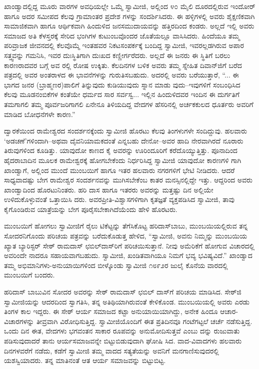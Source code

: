 ಖಾಂಡ್ವಾದಲ್ಲಿದ್ದ ಮೂರು ವಾರಗಳ ಅವಧಿಯಲ್ಲೇ ಒಮ್ಮೆ ಸ್ವಾಮೀಜಿ, ಅಲ್ಲಿಂದ ೪೦ ಮೈಲಿ ದೂರದಲ್ಲಿರುವ ಇಂದೋರ್ ಹಾಗೂ ಅದರ ಸಮೀಪದ ಕೆಲವು ಗ್ರಾಮಾಂತರ ಪ್ರದೇಶ ಗಳನ್ನು ಸಂದರ್ಶಿಸಿದರು. ಈ ಹಳ್ಳಿಗಳಲ್ಲಿ ಅವರು ಶೈಕ್ಷಣಿಕವಾಗಿ ಸಾಮಾಜಿಕವಾಗಿ ಹಾಗೂ ಆರ್ಥಿಕವಾಗಿ ಹಿಂದುಳಿದ ಜನಸಮುದಾಯವನ್ನು ಹತ್ತಿರದಿಂದ ಕಂಡರು. ಅಲ್ಲದೆ ಇಲ್ಲಿ ಅವರು ಸಮಾಜದ ಅತಿ ಕೆಳಸ್ತರಕ್ಕೆ ಸೇರಿದ ಭಂಗಿಗಳ ಕುಟುಂಬವೊಂದರ ಜೊತೆಯಲ್ಲೂ ವಾಸಿಸಿದರು. ಹಿಂದೆಯೂ ತಮ್ಮ ಪರಿವ್ರಾಜಕ ಜೀವನದಲ್ಲಿ ಕೆಲವೊಮ್ಮೆ ಇಂತಹವರ ನಿಕಟಸಂಪರ್ಕಕ್ಕೆ ಬಂದಿದ್ದ ಸ್ವಾಮೀಜಿ, ಇವರಲ್ಲಡಗಿರುವ ಅಪಾರ ಸತ್ತ್ವವನ್ನು ಗಮನಿಸಿ, ಇವರ ದುಃಸ್ಥಿತಿಗಾಗಿ ದುಃಖದ ಕಣ್ಣೀರ್ಗರೆದರು. ಅಲ್ಲದೆ ಈ ಜನರು ಈ ಸ್ಥಿತಿಗೆ ಬರಲು ಕಾರಣರಾದವರ ಬಗ್ಗೆ ಅವ ರಲ್ಲಿ ರೋಷ ಉಕ್ಕಿತು. ಕೆಲದಿನಗಳ ಬಳಿಕ ಅವರು ತಮ್ಮ ಸ್ನೇಹಿತ ದಿವಾನ್​ಜಿಗೆ ಬರೆದ ಪತ್ರದಲ್ಲಿ ಅವರ ಅಂತರಾಳದ ಈ ಭಾವನೆಗಳನ್ನು ಗುರುತಿಸಬಹುದು. ಅದರಲ್ಲಿ ಅವರು ಬರೆಯುತ್ತಾರೆ, “... ಈ ಭಾಗದ ಜನರ (ಬ್ರಾಹ್ಮಣರ)ಪಾಲಿಗೆ ತಿನ್ನುವುದು ಕುಡಿಯುವುದು ಸ್ನಾನ ಮಾಡು ವುದು–ಇವುಗಳಿಗೆ ಸಂಬಂಧಿಸಿದ ಕೆಲವು ಮೂಡನಂಬಿಕೆಗಳ ಕಂತೆಯೇ ಧರ್ಮದ ಸಾರ ಸರ್ವಸ್ವ... ಇಲ್ಲಿನ ಹಿಂದುಳಿದವರ ಇಂದಿನ ಈ ದುರ್ಗತಿಗೆ ತಮಗಾಗಲಿ ತಮ್ಮ ಪೂರ್ವಜರಿಗಾಗಲಿ ಏನೇನೂ ತಿಳಿಯದಿದ್ದ ವೇದಗಳ ಹೆಸರಿನಲ್ಲಿ ಅರ್ಚಕಕುಲದ ಧೂರ್ತರು ಅವರಿಗೆ ಮಾಡಿದ ಬೋಧನೆಗಳೇ ಕಾರಣ.”

ದ್ವಾರಕೆಯಿಂದ ರಾಮೇಶ್ವರದ ಸಂದರ್ಶನಕ್ಕೆಂದು ಸ್ವಾಮೀಜಿ ಹೊರಟು ಕೆಲವು ತಿಂಗಳುಗಳೇ ಸಂದಿದ್ದುವು. ಹಲವಾರು ‘ಅಡಚಣೆ’ಗಳಿಂದಾಗಿ–ಅಥವಾ ದೈವನಿಯಾಮಕದಂತೆ ಎನ್ನಬಹು ದೇನೋ–ಅವರ ಹಾದಿ ನೇರವಾಗಿರದೆ ನೂರಾರು ತಿರುವುಗಳಿಂದ ಕೂಡಿತ್ತು. ಯಾವುದೋ ಕಾಣದ ಕೈ ಅವರನ್ನು ಊರಿಂದೂರಿಗೆ ಕರೆದೊಯ್ಯುತ್ತಿತ್ತು. ಪೂನಾದಿಂದ ಹೈದರಾಬಾದಿನ ಮೂಲಕ ರಾಮೇಶ್ವರಕ್ಕೆ ಹೋಗಬೇಕೆಂದು ನಿರ್ಧರಿಸಿದ್ದ ಸ್ವಾಮೀಜಿ ಯಾವುದೋ ಕಾರಣಗಳಿ ಗಾಗಿ ಖಾಂಡ್ವಾಗೆ, ಅಲ್ಲಿಂದ ಮುಂದೆ ಮುಂಬಯಿಗೆ ಹಾಗೂ ಇತರ ಹಲವಾರು ನಗರಗಳಿಗೆ ಭೇಟಿ ನೀಡಿದರು. ಆದರೆ ಸಾಧ್ಯವಾದಷ್ಟು ಬೇಗ ರಾಮೇಶ್ವರ ಸಂದರ್ಶನವನ್ನು ಮುಗಿಸಬೇಕೆಂಬ ಕಾತರ ಮನಸ್ಸಿನಲ್ಲಿದ್ದೇ ಇತ್ತು. ಆದ್ದರಿಂದ ಅವರು ಖಾಂಡ್ವಾದಿಂದ ಹೊರಟುನಿಂತರು. ಹರಿ ದಾಸ ಹಾಗೂ ಇತರರು ಅವರನ್ನು ಮತ್ತಷ್ಟು ದಿನ ಅಲ್ಲಿಯೇ ಉಳಿದುಕೊಳ್ಳುವಂತೆ ಒತ್ತಾಯಿಸಿ ದರು. ಅವರಪ್ರೀತಿ-ವಿಶ್ವಾಸಗಳಿಗಾಗಿ ಕೃತಜ್ಞತೆ ವ್ಯಕ್ತಪಡಿಸಿದ ಸ್ವಾಮೀಜಿ, ತಾವು ಕೈಗೊಂಡಿರುವ ಯಾತ್ರೆಯನ್ನು ಬೇಗ ಪೂರೈಸಬೇಕಾಗಿದೆಯೆಂದು ಹೇಳಿ ಹೊರಟರು.

ಮುಂಬಯಿಗೆ ಹೋಗಲು ಸ್ವಾಮೀಜಿಗೆ ರೈಲು ಟಿಕೆಟ್ಟನ್ನು ತೆಗೆಸಿಕೊಟ್ಟ ಹರಿದಾಸ್​ಬಾಬು, ಮುಂಬಯಿಯಲ್ಲಿರುವ ತನ್ನ ಸೋದರನಿಗೊಂದು ಪರಿಚಯ ಪತ್ರವನ್ನು ಬರೆದುಕೊಡುತ್ತ ಹೇಳಿದ, “ಸ್ವಾಮೀಜಿ, ಅವನು ನಿಮ್ಮನ್ನು ಮುಂಬಯಿಯ ಖ್ಯಾತ ಬ್ಯಾರಿಸ್ಟರ್ ಸೇಠ್ ರಾಮದಾಸ್ ಛಬಿಲ್​ದಾಸ್​ರಿಗೆ ಪರಿಚಯಿಸುತ್ತಾನೆ. ನೀವು ಅಮೆರಿಕೆಗೆ ಹೋಗುವ ವಿಚಾರದಲ್ಲಿ ಅವರಿಂದೇ ನಾದರೂ ಸಹಾಯವಾಗಬಹುದು. ಸ್ವಾಮೀಜಿ, ಖಂಡಿತವಾಗಿಯೂ ನಿಮಗೆ ಭವ್ಯ ಭವಿಷ್ಯವಿದೆ.” ಖಾಂಡ್ವಾದ ತಮ್ಮ ಅಭಿಮಾನಿಗಳು-ಅನುಯಾಯಿಗಳಿಂದ ಬೀಳ್ಕೊಂಡು ಸ್ವಾಮೀಜಿ ೧೮೯೨ರ ಜುಲೈ ಕೊನೆಯ ವಾರದಲ್ಲಿ ಮುಂಬಯಿಗೆ ಬಂದರು.

ಹರಿದಾಸ್ ಬಾಬುವಿನ ಸೋದರ ಅವರನ್ನು ಸೇಠ್ ರಾಮದಾಸ್ ಛಬಿಲ್ ದಾಸ್​ಗೆ ಪರಿಚಯ ಮಾಡಿಸಿದ. ಸೇಠ್​ಜಿ ಸ್ವಾಮೀಜಿಯನ್ನು ಆದರದಿಂದ ಸ್ವಾಗತಿಸಿ, ತನ್ನ ಅತಿಥಿಯಾಗಿರುವಂತೆ ಕೇಳಿಕೊಂಡ. ಮುಂಬಯಿಯಲ್ಲಿ ಅವರು ಎರಡು ತಿಂಗಳ ಕಾಲ ಇದ್ದರು. ಈ ಸೇಠ್ ಆರ್ಯ ಸಮಾಜದ ಕಟ್ಟಾ ಅನುಯಾಯಿಯಾಗಿದ್ದು, ಅನೇಕ ಹಿಂದೂ ಆಚಾರ-ವಿಚಾರಗಳನ್ನು ತೀವ್ರವಾಗಿ ವಿರೋಧಿಸುತ್ತಿದ್ದ. ಸ್ವಾಮೀಜಿಯೊಂದಿಗೆ ಈತ ಪ್ರತಿದಿನವೂ ಗಂಟೆಗಟ್ಟಲೆ ಚರ್ಚೆ ನಡೆಸುತ್ತಿದ್ದ. ಒಂದು ದಿನ ಈತ, ವೇದಗಳು ಭಗವಂತನ ಸಾಕಾರ ರೂಪವನ್ನು ಅನುಮೋದಿಸುತ್ತವೆ ಎಂಬು ದನ್ನು ರುಜುವಾತು ಪಡಿಸುವುದಾದರೆ ತಾನು ಆರ್ಯಸಮಾಜವನ್ನೇ ಬಿಟ್ಟುಬಿಡುವುದಾಗಿ ಘೋಷಿ ಸಿದ. ವಾದ-ವಿವಾದಗಳು ಹಲವಾರು ದಿನಗಳವರೆಗೆ ನಡೆದು, ಕಡೆಗೆ ಸ್ವಾಮೀಜಿ ತಮ್ಮ ವಾದದ ಸತ್ಯತೆಯನ್ನು ಅವನಿಗೆ ಮನಗಾಣಿಸುವುದರಲ್ಲಿ ಯಶಸ್ವಿಯಾದರು. ತನ್ನ ಮಾತಿನಂತೆ ಆತ ಆರ್ಯ ಸಮಾಜವನ್ನು ಬಿಟ್ಟುಬಿಟ್ಟ.

